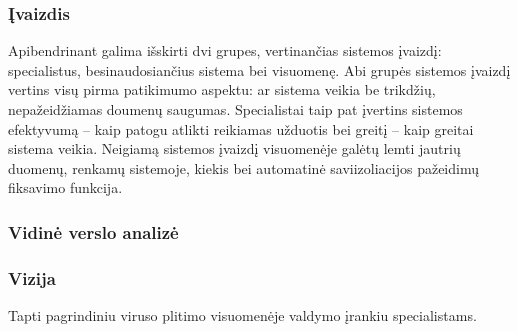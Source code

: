 \documentclass{VUMIFPSkursinis}
\begin{document}
\subsubsection{Įvaizdis}
Apibendrinant galima išskirti dvi grupes, vertinančias sistemos įvaizdį: specialistus, besinaudosiančius sistema
bei visuomenę. Abi grupės sistemos įvaizdį vertins visų pirma patikimumo aspektu: ar sistema veikia be trikdžių,
nepažeidžiamas doumenų saugumas. Specialistai taip pat įvertins sistemos efektyvumą -- kaip patogu atlikti reikiamas
užduotis bei greitį -- kaip greitai sistema veikia. Neigiamą sistemos įvaizdį visuomenėje galėtų lemti jautrių duomenų,
renkamų sistemoje, kiekis bei automatinė saviizoliacijos pažeidimų fiksavimo funkcija.

\begin{table}[]
	\centering
\end{table}

\subsubsection{Vidinė verslo analizė}

\subsubsection{Vizija}
Tapti pagrindiniu viruso plitimo visuomenėje valdymo įrankiu specialistams.
\end{document}
